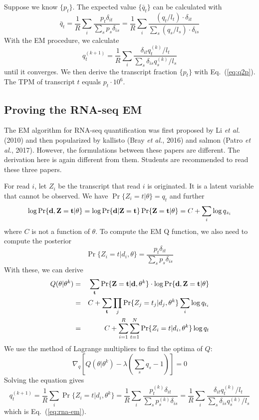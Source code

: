 \documentclass[10pt]{article}
\begin{document}
Suppose we know $\{p_t\}$. The expected value $\{\bar{q}_t\}$ can be calculated with
$$
\bar{q}_t=\frac{1}{R}\sum_i\frac{p_t\delta_{it}}{\sum_s{p_s\delta_{is}}}
=\frac{1}{R}\sum_i\frac{(q_t/l_t)\cdot\delta_{it}}{\sum_s{(q_s/l_s)\cdot\delta_{is}}}
$$
With the EM procedure, we calculate
\begin{equation}\label{eq:rna-em}
q_t^{(k+1)}=\frac{1}{R}\sum_i\frac{\delta_{it}q_t^{(k)}/l_t}{\sum_s{\delta_{is}q_s^{(k)}/l_s}}
\end{equation}
until it converges.
We then derive the transcript fraction $\{p_t\}$ with Eq.~(\ref{eq:q2p}).
The TPM of transcript $t$ equals $p_t\cdot10^6$.

\subsection{Proving the RNA-seq EM}

The EM algorithm for RNA-seq quantification was first proposed by Li \emph{et
al.} (2010) and then popularized by kallisto (Bray \emph{et al.}, 2016) and
salmon (Patro \emph{et al.}, 2017).
However, the formulations between these papers are different.
The derivation here is again different from them.
Students are recommended to read these three papers.

For read $i$, let $Z_i$ be the transcript that read $i$ is originated.
It is a latent variable that cannot be observed.
We have $\Pr\{Z_i=t|\theta\}=q_t$ and further
\[
\log\Pr\{{\bf d},{\bf Z}={\bf t}|\theta\}=\log\Pr\{{\bf d}|{\bf Z}={\bf t}\}\Pr\{{\bf Z}={\bf t}|\theta\}=C+\sum_i\log q_{z_i}
\]
where $C$ is not a function of $\theta$.
To compute the EM Q function, we also need to compute the posterior
$$
\Pr\{Z_i=t|d_i,\theta\}=\frac{p_t\delta_{it}}{\sum_{s}p_s\delta_{is}}
$$
With these, we can derive
\begin{eqnarray*}
Q(\theta|\theta^k)&=&\sum_{{\bf t}}\Pr\{{\bf Z}={\bf t}|{\bf d},\theta^k\}\cdot\log\Pr\{{\bf d},{\bf Z}={\bf t}|\theta\}\\
&=&C+\sum_{{\bf t}}\prod_j\Pr\{Z_j=t_j|d_j,\theta^k\}\sum_i\log q_{t_i}\\
&=&C+\sum_{i=1}^R\sum_{t=1}^N\Pr\{Z_i=t|d_i,\theta^k\}\log q_t\\
\end{eqnarray*}
We use the method of Lagrange multipliers to find the optima of $Q$:
$$
\nabla_q\left[Q(\theta|\theta^k)-\lambda\left(\sum_sq_s-1\right)\right]=0
$$
Solving the equation gives
$$
q^{(k+1)}_t=\frac{1}{R}\sum_i\Pr\{Z_i=t|d_i,\theta^k\}=\frac{1}{R}\sum_i\frac{p^{(k)}_t\delta_{it}}{\sum_s{p^{(k)}_s\delta_{is}}}
=\frac{1}{R}\sum_i\frac{\delta_{it}q^{(k)}_t/l_t}{\sum_s{\delta_{is}q^{(k)}_s/l_s}}
$$
which is Eq.~(\ref{eq:rna-em}).
\end{document}
